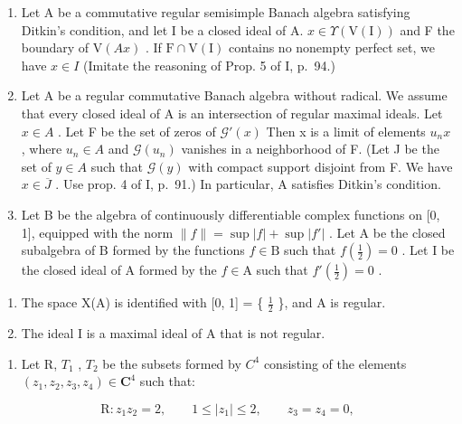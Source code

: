 \begin{enumerate}
\def\labelenumi{\arabic{enumi})}
\setcounter{enumi}{3}
\item
  Let A be a commutative regular semisimple Banach algebra satisfying Ditkin's condition, and let I be a closed ideal of A. \(x \in \Upsilon(\mathrm{V}(\mathrm{I}))\) and F the boundary of \(\mathrm{V}(Ax)\) . If \(\mathrm{F} \cap \mathrm{V}(\mathrm{I})\) contains no nonempty perfect set, we have \(x \in I\) (Imitate the reasoning of Prop. 5 of I, p.~94.)
\item
  Let A be a regular commutative Banach algebra without radical. We assume that every closed ideal of A is an intersection of regular maximal ideals. Let \(x \in A\) . Let F be the set of zeros of \(\mathcal{G}'(x)\) Then x is a limit of elements \(u_{n}x\) , where \(u_{n} \in A\) and \(\mathcal{G}(u_{n})\) vanishes in a neighborhood of F. (Let J be the set of \(y \in A\) such that \(\mathcal{G}(y)\) with compact support disjoint from F. We have \(x \in \overline{J}\) . Use prop. 4 of I, p.~91.) In particular, A satisfies Ditkin's condition.
\item
  Let B be the algebra of continuously differentiable complex functions on {[}0, 1{]}, equipped with the norm \(\|f\| = \sup |f| + \sup |f'|\) . Let A be the closed subalgebra of B formed by the functions \(f \in \mathrm{B}\) such that \(f\left(\frac{1}{2}\right) = 0\) . Let I be the closed ideal of A formed by the \(f \in \mathrm{A}\) such that \(f'\left(\frac{1}{2}\right) = 0\) .
\end{enumerate}

\begin{enumerate}
\def\labelenumi{\alph{enumi})}
\item
  The space X(A) is identified with {[}0, 1{]} = \{ \(\frac{1}{2}\) \}, and A is regular.
\item
  The ideal I is a maximal ideal of A that is not regular.
\end{enumerate}

\begin{enumerate}
\def\labelenumi{\arabic{enumi})}
\setcounter{enumi}{6}
\tightlist
\item
  Let R, \(T_{1}\) , \(T_{2}\) be the subsets formed by \(C^{4}\) consisting of the elements \((z_{1}, z_{2}, z_{3}, z_{4}) \in \mathbf{C}^{4}\) such that:
\end{enumerate}

\[
\mathrm{R} \colon z _ {1} z _ {2} = 2, \qquad 1 \leqslant | z _ {1} | \leqslant 2, \qquad z _ {3} = z _ {4} = 0,
\]

